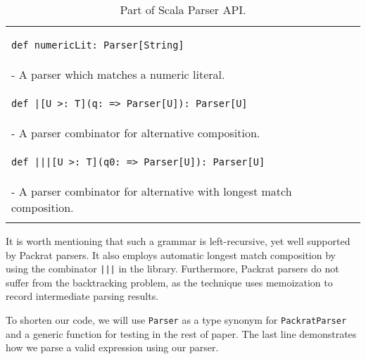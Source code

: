 \begin{table}[t]
\begin{tabular}{l}
\hline
\begin{lstlisting}
def numericLit: Parser[String]
\end{lstlisting} \\
\hspace{.2in}- A parser which matches a numeric literal. \\
\hline
\begin{lstlisting}
def |[U >: T](q: => Parser[U]): Parser[U]
\end{lstlisting} \\
\hspace{.2in}- A parser combinator for alternative composition. \\
\hline
\begin{lstlisting}
def |||[U >: T](q0: => Parser[U]): Parser[U]
\end{lstlisting} \\
\hspace{.2in}- A parser combinator for alternative with longest match composition. \\
\hline \\
\end{tabular}
\caption{Part of Scala Parser API.}\label{tab:packrat}
\end{table}

It is worth mentioning that such a grammar is left-recursive, yet well supported by Packrat parsers. It also employs automatic
longest match composition by using the combinator \lstinline{|||} in the library. Furthermore, Packrat parsers do not suffer from the backtracking
problem, as the technique uses memoization to record intermediate parsing results.

To shorten our code, we will use \lstinline{Parser} as a type synonym for \lstinline{PackratParser} and a generic  function for testing in the rest of paper. The last line demonstrates how we parse a valid expression  using our parser.

